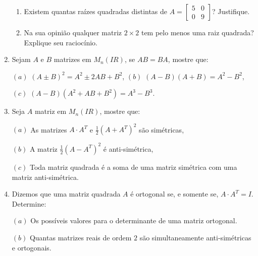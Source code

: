 \documentclass{report}
\newcommand{\real}{I\!\!R}               %
\begin{document}
\begin{Exercise}
\begin{enumerate}
\begin{enumerate}
\item  Existem quantas raízes quadradas distintas de $A=\left[
\begin{array}{cc}
5 & 0 \\
0 & 9
\end{array}
\right] $? Justifique.

\item  Na sua opinião qualquer matriz $2\times 2$ tem pelo menos
uma raiz quadrada? Explique seu raciocínio.
\end{enumerate}


\item \label{1lista12} Sejam $A$ e $B$ matrizes em $M_n(\real)$,
se $AB=BA$, mostre que:

$(a)$ $(A\pm B)^2 = A^2 \pm 2AB+B^2$, \hspace{2cm} $(b)$
$(A-B)(A+B) = A^2 - B^2$,

$(c)$ $(A-B)(A^2 +AB+B^2) = A^3 - B^3$.


\item \label{1lista13} Seja $A$ matriz em $M_n(\real)$, mostre
que:

$(a)$ As matrizes $A\cdot A^T$ e $\frac{1}{2}(A+A^T)^2$ são
simétricas,

$(b)$ A matriz $\frac{1}{2}(A-A^T)^2$ é anti-simétrica,

$(c)$ Toda matriz quadrada é a soma de uma matriz simétrica com
uma matriz anti-simétrica.


\item \label{1lista14} Dizemos que uma matriz quadrada $A$ é
ortogonal se, e somente se, $A\cdot A^T = I$. Determine:

$(a)$ Os possíveis valores para o determinante de uma matriz
ortogonal.

$(b)$ Quantas matrizes reais de ordem $2$ são simultaneamente
anti-simétricas e ortogonais.



\end{enumerate}
\end{Exercise}
\end{document}
